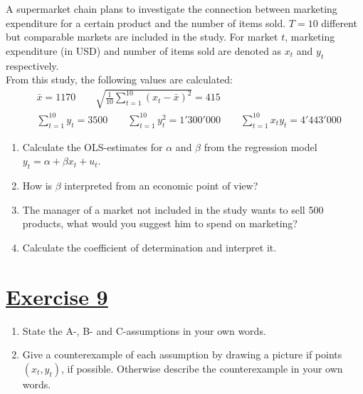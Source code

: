 \documentclass[captions=tableheading, 12pt, headings=small, parskip=half]{scrartcl}
\begin{document}
A supermarket chain plans to investigate the connection between marketing expenditure for a certain product and the number of items sold. $T=10$ different but comparable markets are included in the study. For market $t$, marketing expenditure (in USD) and number of items sold are denoted as $x_t$ and $y_t$ respectively.\\
From this study, the following values are calculated:
\begin{align*}
&\bar{x}=1170 \qquad \sqrt{\frac{1}{10}\sum_{t = 1}^{10}{(x_t - \bar{x})^2}} = 415\\
&\sum_{t = 1}^{10}{y_t} = 3500 \qquad \sum_{t = 1}^{10}{y_t^2} = 1'300'000 \qquad \sum_{t = 1}^{10}{x_ty_t} = 4'443'000
\end{align*}
\begin{enumerate}[label = \alph*)]
	\item Calculate the OLS-estimates for $\alpha$ and $\beta$ from the regression model\\
	$y_t = \alpha + \beta x_t + u_t$.
	\item How is $\beta$ interpreted from an economic point of view?
	\item The manager of a market not included in the study wants to sell 500 products, what would you suggest him to spend on marketing?
	\item Calculate the coefficient of determination and interpret it.
\end{enumerate}

\section*{\underline{Exercise 9}}
\begin{enumerate}[label = \alph*)]
	\item State the A-, B- and C-assumptions in your own words.
	\item Give a counterexample of each assumption by drawing a picture if points $(x_t, y_t)$, if possible. Otherwise describe the counterexample in your own words.
\end{enumerate}
\end{document}
